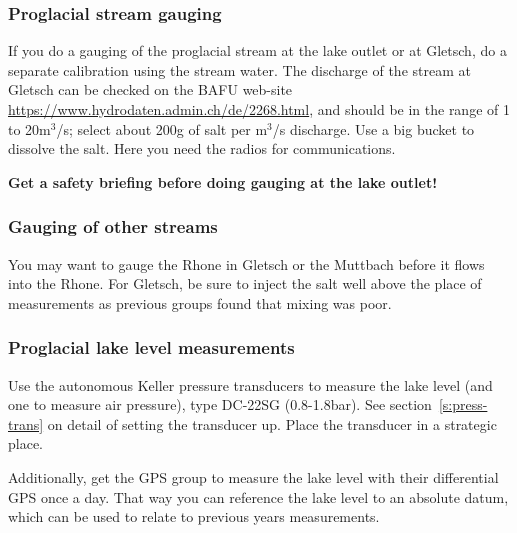 \documentclass[DIV=15,halfparskip,11pt,headinclude]{scrartcl}
\begin{document}
\subsubsection{Proglacial stream gauging}

If you do a gauging of the proglacial stream at the lake outlet or at
Gletsch, do a separate calibration using the stream water.  The
discharge of the stream at Gletsch can be checked on the BAFU web-site
\url{https://www.hydrodaten.admin.ch/de/2268.html}, and should be in
the range of 1 to 20m$^3$/s; select about 200g of salt per m$^3$/s
discharge.  Use a big bucket to dissolve the salt.  Here you need the
radios for communications.

{\bf Get a safety briefing before doing gauging at the lake outlet!}

\subsubsection{Gauging of other streams}

You may want to gauge the Rhone in Gletsch or the Muttbach before it
flows into the Rhone.  For Gletsch, be sure to inject the salt well
above the place of measurements as previous groups found that mixing
was poor.

\subsubsection{Proglacial lake level measurements}

Use the autonomous Keller pressure transducers to measure the lake
level (and one to measure air pressure), type DC-22SG (0.8-1.8bar).
%
See section~\ref{s:press-trans} on detail of setting the transducer up.
Place the transducer in a strategic place.

Additionally, get the GPS group to measure the lake level with their
differential GPS once a day.  That way you can reference the lake
level to an absolute datum, which can be used to relate to previous
years measurements.
\end{document}
